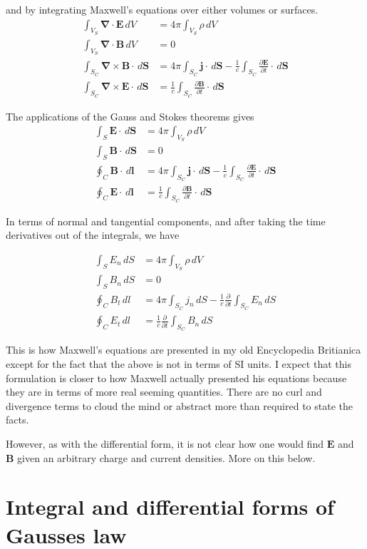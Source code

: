 \documentclass{article}      %
\newcommand{\grad}[0]{\boldsymbol{\nabla}}
\newcommand{\curl}[0]{\grad \times}
\newcommand{\diverg}[0]{\grad \cdot}
\newcommand{\D}[2] {\frac {\partial #2} {\partial #1}}
\newcommand{\Bj}[0]{\mathbf{j}}
\newcommand{\BB}[0]{\mathbf{B}}
\newcommand{\BE}[0]{\mathbf{E}}
\newcommand{\BS}[0]{\mathbf{S}}
\begin{document}
and by integrating Maxwell's equations over either volumes or surfaces.
\begin{align*}
\int_{V_S} \diverg \BE \, dV &= 4\pi \int_{V_S} \rho\, dV \\
\int_{V_S} \diverg \BB \, dV &= 0 \\
\int_{S_C} \curl \BB \cdot \, d\BS &= 4\pi \int_{S_C} \Bj \cdot \, d\BS - \frac{1}{c} \int_{S_C} \D{t}{\BE} \cdot \, d\BS \\
\int_{S_C} \curl \BE \cdot \, d\BS &= \frac{1}{c} \int_{S_C} \D{t}{\BB} \cdot \, d\BS
\end{align*}

The applications of the Gauss and Stokes theorems gives
\begin{align*}
\int_{S} \BE \cdot \, d\BS &= 4\pi \int_{V_S} \rho\, dV \\
\int_{S} \BB \cdot \, d\BS &= 0 \\
\oint_{C} \BB \cdot \, d\mathbf{l} &= 4\pi \int_{S_C} \Bj \cdot \, d\BS - \frac{1}{c} \int_{S_C} \D{t}{\BE} \cdot \, d\BS \\
\oint_{C} \BE \cdot \, d\mathbf{l} &= \frac{1}{c} \int_{S_C} \D{t}{\BB} \cdot \, d\BS
\end{align*}

In terms of normal and tangential components, and after taking the time 
derivatives out of the integrals, we have

\begin{align*}
\int_{S} E_n \, dS &= 4\pi \int_{V_S} \rho\, dV \\
\int_{S} B_n \, dS &= 0 \\
\oint_{C} B_t \, dl &= 4\pi \int_{S_C} j_n \, dS - \frac{1}{c} \D{t}{} \int_{S_C} E_n \, dS \\
\oint_{C} E_t \, dl &= \frac{1}{c} \D{t}{} \int_{S_C} B_n \, dS
\end{align*}

This is how 
Maxwell's equations are presented in my old 
Encyclopedia Britianica 
except for the fact that 
the above is not in terms of SI units.  I expect that this formulation is closer to how 
Maxwell actually presented his equations because they are in terms of more real 
seeming quantities.  There are no curl and divergence terms to cloud the mind or
abstract more than required to state the facts.

However, as with the differential form, it is not clear how one would find
$\BE$ and $\BB$ given an arbitrary charge and current densities.  More on 
this below.

\section{Integral and differential forms of Gausses law}
\end{document}
